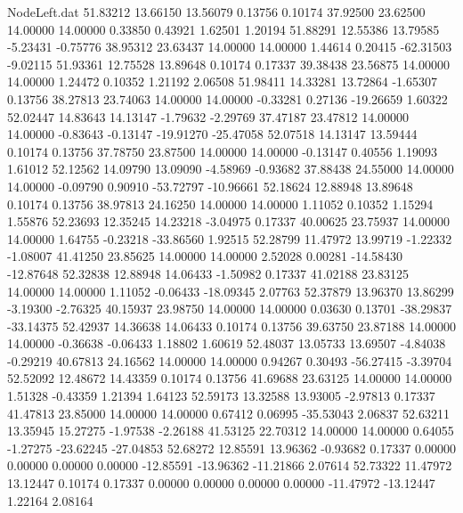 \begin{filecontents}{NodeLeft.dat}
  51.83212   13.66150   13.56079     0.13756    0.10174   37.92500   23.62500   14.00000   14.00000    0.33850    0.43921    1.62501    1.20194
  51.88291   12.55386   13.79585    -5.23431   -0.75776   38.95312   23.63437   14.00000   14.00000    1.44614    0.20415  -62.31503   -9.02115
  51.93361   12.75528   13.89648     0.10174    0.17337   39.38438   23.56875   14.00000   14.00000    1.24472    0.10352    1.21192    2.06508
  51.98411   14.33281   13.72864    -1.65307    0.13756   38.27813   23.74063   14.00000   14.00000   -0.33281    0.27136  -19.26659    1.60322
  52.02447   14.83643   14.13147    -1.79632   -2.29769   37.47187   23.47812   14.00000   14.00000   -0.83643   -0.13147  -19.91270  -25.47058
  52.07518   14.13147   13.59444     0.10174    0.13756   37.78750   23.87500   14.00000   14.00000   -0.13147    0.40556    1.19093    1.61012
  52.12562   14.09790   13.09090    -4.58969   -0.93682   37.88438   24.55000   14.00000   14.00000   -0.09790    0.90910  -53.72797  -10.96661
  52.18624   12.88948   13.89648     0.10174    0.13756   38.97813   24.16250   14.00000   14.00000    1.11052    0.10352    1.15294    1.55876
  52.23693   12.35245   14.23218    -3.04975    0.17337   40.00625   23.75937   14.00000   14.00000    1.64755   -0.23218  -33.86560    1.92515
  52.28799   11.47972   13.99719    -1.22332   -1.08007   41.41250   23.85625   14.00000   14.00000    2.52028    0.00281  -14.58430  -12.87648
  52.32838   12.88948   14.06433    -1.50982    0.17337   41.02188   23.83125   14.00000   14.00000    1.11052   -0.06433  -18.09345    2.07763
  52.37879   13.96370   13.86299    -3.19300   -2.76325   40.15937   23.98750   14.00000   14.00000    0.03630    0.13701  -38.29837  -33.14375
  52.42937   14.36638   14.06433     0.10174    0.13756   39.63750   23.87188   14.00000   14.00000   -0.36638   -0.06433    1.18802    1.60619
  52.48037   13.05733   13.69507    -4.84038   -0.29219   40.67813   24.16562   14.00000   14.00000    0.94267    0.30493  -56.27415   -3.39704
  52.52092   12.48672   14.43359     0.10174    0.13756   41.69688   23.63125   14.00000   14.00000    1.51328   -0.43359    1.21394    1.64123
  52.59173   13.32588   13.93005    -2.97813    0.17337   41.47813   23.85000   14.00000   14.00000    0.67412    0.06995  -35.53043    2.06837
  52.63211   13.35945   15.27275    -1.97538   -2.26188   41.53125   22.70312   14.00000   14.00000    0.64055   -1.27275  -23.62245  -27.04853
  52.68272   12.85591   13.96362    -0.93682    0.17337    0.00000    0.00000    0.00000    0.00000  -12.85591  -13.96362  -11.21866    2.07614
  52.73322   11.47972   13.12447     0.10174    0.17337    0.00000    0.00000    0.00000    0.00000  -11.47972  -13.12447    1.22164    2.08164

\end{filecontents}
